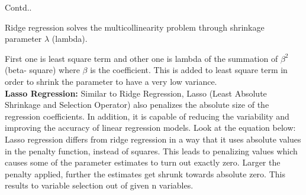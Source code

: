 \documentclass{beamer}
\begin{document}
\begin{frame}{Contd..}
\begin{flushleft}
Ridge regression solves the multicollinearity problem through shrinkage parameter $\lambda$ (lambda). 

First one is least square term and other one is lambda of the summation of $\beta^2$ (beta- square) where $\beta$ is the coefficient. This is added to least square term in order to shrink the parameter to have a very low variance.
\\
\vspace{10pt}
	\textbf{Lasso Regression:}
Similar to Ridge Regression, Lasso (Least Absolute Shrinkage and Selection Operator) also penalizes the absolute size of the regression coefficients. In addition, it is capable of reducing the variability and improving the accuracy of linear regression models.  Look at the equation below: Lasso regression differs from ridge regression in a way that it uses absolute values in the penalty function, instead of squares. This leads to penalizing values which causes some of the parameter estimates to turn out exactly zero. Larger the penalty applied, further the estimates get shrunk towards absolute zero. This results to variable selection out of given n variables.

\end{flushleft}
\end{frame}
\end{document}
